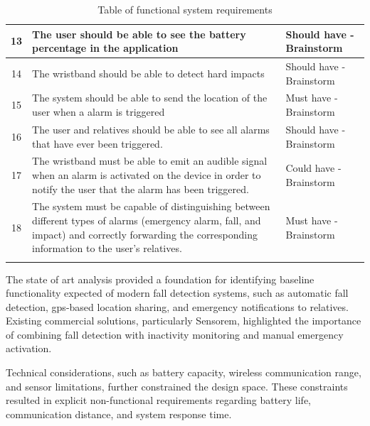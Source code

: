 \begin{longtable}{|c|p{8cm}|p{4cm}|}
\hline
13 & The user should be able to see the battery percentage in the application & Should have - Brainstorm \\
\hline
14 & The wristband should be able to detect hard impacts & Should have - Brainstorm \\
\hline
15 & The system should be able to send the location of the user when a alarm is triggered & Must have - Brainstorm \\
\hline
16 & The user and relatives should be able to see all alarms that have ever been triggered. & Should have - Brainstorm \\
\hline
17 & The wristband must be able to emit an audible signal when an alarm is activated on the device in order to notify the user that the alarm has been triggered. & Could have - Brainstorm \\
\hline
18 & The system must be capable of distinguishing between different types of alarms (emergency alarm, fall, and impact) and correctly forwarding the corresponding information to the user’s relatives. & Must have - Brainstorm \\
\hline
\caption{Table of functional system requirements}
\label{tab:funktionelle_krav_tabel}
\end{longtable}

The state of art analysis provided a foundation for identifying baseline functionality expected of modern fall detection systems, such as automatic fall detection, \gls{gps}-based location sharing, and emergency notifications to relatives. Existing commercial solutions, particularly Sensorem, highlighted the importance of combining fall detection with inactivity monitoring and manual emergency activation.

Technical considerations, such as battery capacity, wireless communication range, and sensor limitations, further constrained the design space. These constraints resulted in explicit non-functional requirements regarding battery life, communication distance, and system response time.


\renewcommand{\arraystretch}{1.3}

